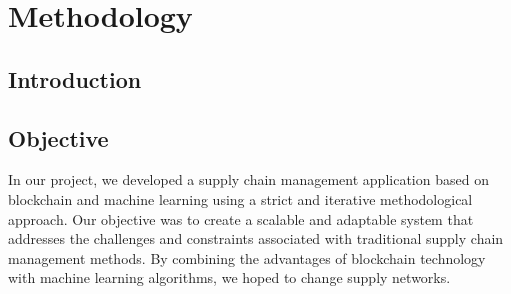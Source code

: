 
\chapter{Methodology}\doublespacing %

\label{Chapter4} %




\section{Introduction}
\lipsum[1-4]


\section{Objective}
\noindent In our project, we developed a supply chain management application based on blockchain and machine learning using a strict and iterative methodological approach. Our objective was to create a scalable and adaptable system that addresses the challenges and constraints associated with traditional supply chain management methods. By combining the advantages of blockchain technology with machine learning algorithms, we hoped to change supply networks.
